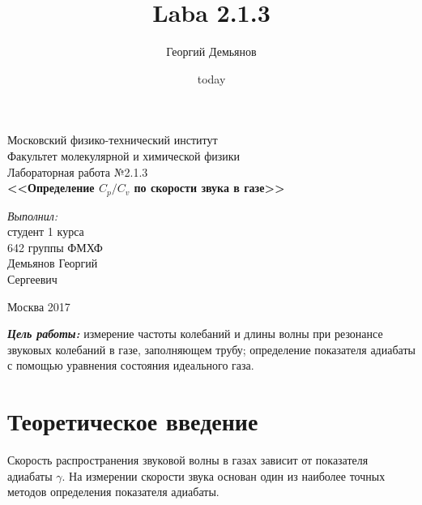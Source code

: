 \documentclass[a4paper,12pt]{article}
\title{Laba 2.1.3}
\author{Георгий Демьянов}
\date{today}
\begin{document}
 
\begin{titlepage}
\begin{center} 
 
\large Московский физико-технический институт\\
Факультет молекулярной и химической физики\\
\vspace{7cm}
\huge Лабораторная работа №2.1.3\\
\textbf{\Large <<Определение $C_p/C_v$ по скорости звука в газе>>}\\
\end{center} 

\vspace{7.5cm}
{\par \raggedleft \large \emph{Выполнил:}\\ студент 1 курса\\ 642 группы ФМХФ\\ Демьянов Георгий\\ Сергеевич \par}
\begin{center}
\vfill Москва 2017
\end{center}
\end{titlepage}

\newpage
\setcounter{page}{2}

\begin{center}
\end{center}

\textbf{\emph{Цель работы:}} измерение частоты колебаний и длины волны при резонансе звуковых колебаний в газе, заполняющем трубу; определение показателя адиабаты с помощью уравнения состояния идеального газа.
\section{Теоретическое введение}
Скорость распространения звуковой волны в газах зависит от показателя адиабаты $\gamma$. На измерении скорости звука основан один из наиболее точных методов определения показателя адиабаты.
\end{document}
